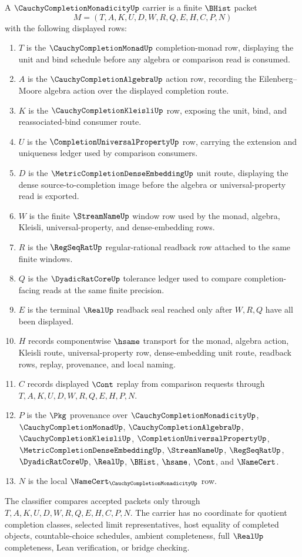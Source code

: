 \begin{definition}
\label{def:cauchy-completion-monadicity-carrier}
A $\CauchyCompletionMonadicityUp$ carrier is a finite $\BHist$ packet
$$
M=(T,A,K,U,D,W,R,Q,E,H,C,P,N)
$$
with the following displayed rows:
\begin{enumerate}
\item $T$ is the $\CauchyCompletionMonadUp$ completion-monad row, displaying the unit and bind schedule before any algebra or comparison read is consumed.
\item $A$ is the $\CauchyCompletionAlgebraUp$ action row, recording the Eilenberg--Moore algebra action over the displayed completion route.
\item $K$ is the $\CauchyCompletionKleisliUp$ row, exposing the unit, bind, and reassociated-bind consumer route.
\item $U$ is the $\CompletionUniversalPropertyUp$ row, carrying the extension and uniqueness ledger used by comparison consumers.
\item $D$ is the $\MetricCompletionDenseEmbeddingUp$ unit route, displaying the dense source-to-completion image before the algebra or universal-property read is exported.
\item $W$ is the finite $\StreamNameUp$ window row used by the monad, algebra, Kleisli, universal-property, and dense-embedding rows.
\item $R$ is the $\RegSeqRatUp$ regular-rational readback row attached to the same finite windows.
\item $Q$ is the $\DyadicRatCoreUp$ tolerance ledger used to compare completion-facing reads at the same finite precision.
\item $E$ is the terminal $\RealUp$ readback seal reached only after $W,R,Q$ have all been displayed.
\item $H$ records componentwise $\hsame$ transport for the monad, algebra action, Kleisli route, universal-property row, dense-embedding unit route, readback rows, replay, provenance, and local naming.
\item $C$ records displayed $\Cont$ replay from comparison requests through $T,A,K,U,D,W,R,Q,E,H,P,N$.
\item $P$ is the $\Pkg$ provenance over $\CauchyCompletionMonadicityUp$, $\CauchyCompletionMonadUp$, $\CauchyCompletionAlgebraUp$, $\CauchyCompletionKleisliUp$, $\CompletionUniversalPropertyUp$, $\MetricCompletionDenseEmbeddingUp$, $\StreamNameUp$, $\RegSeqRatUp$, $\DyadicRatCoreUp$, $\RealUp$, $\BHist$, $\hsame$, $\Cont$, and $\NameCert$.
\item $N$ is the local $\NameCert_{\CauchyCompletionMonadicityUp}$ row.
\end{enumerate}
The classifier compares accepted packets only through $T,A,K,U,D,W,R,Q,E,H,C,P,N$. The carrier has no coordinate for quotient completion classes, selected limit representatives, host equality of completed objects, countable-choice schedules, ambient completeness, full $\RealUp$ completeness, Lean verification, or bridge checking.
\end{definition}


